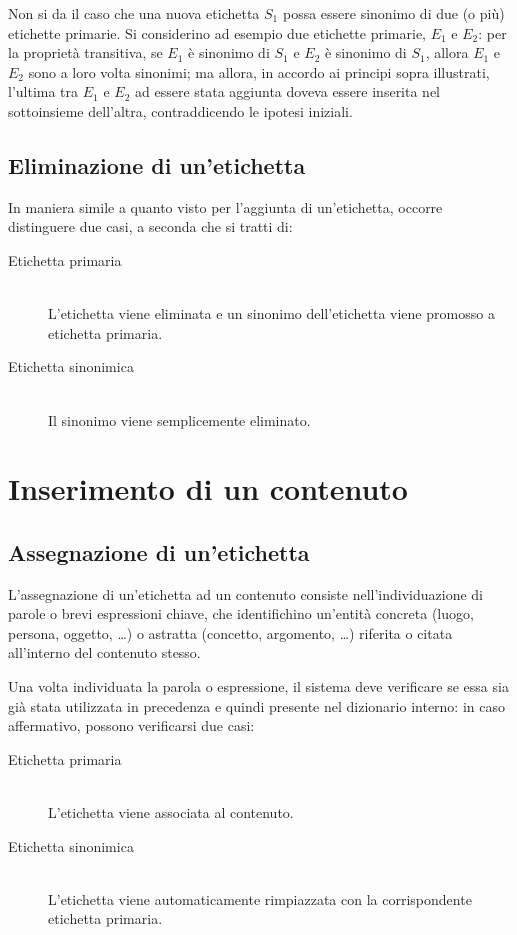 \documentclass[10pt,a4paper,headinclude,footinclude,hidelinks]{scrreprt} %
\begin{document}
	Non si da il caso che una nuova etichetta $S_1$ possa essere sinonimo di due (o più) etichette primarie. Si considerino ad esempio due etichette primarie, $E_1$ e $E_2$: per la proprietà transitiva, se $E_1$ è sinonimo di $S_1$ e $E_2$ è sinonimo di $S_1$, allora $E_1$ e $E_2$ sono a loro volta sinonimi; ma allora, in accordo ai principi sopra illustrati, l'ultima tra $E_1$ e $E_2$ ad essere stata aggiunta doveva essere inserita nel sottoinsieme dell'altra, contraddicendo le ipotesi iniziali.

	\subsection{Eliminazione di un'etichetta}
	In maniera simile a quanto visto per l'aggiunta di un'etichetta, occorre distinguere due casi, a seconda che si tratti di:
	\begin{description}
	\item[Etichetta primaria] \hfill \\
	L'etichetta viene eliminata e un sinonimo dell'etichetta viene promosso a etichetta primaria.
 	\item[Etichetta sinonimica] \hfill \\
	Il sinonimo viene semplicemente eliminato.
	\end{description}
	
	\section{Inserimento di un contenuto}
	\subsection{Assegnazione di un'etichetta}
	L'assegnazione di un'etichetta ad un contenuto consiste nell'individuazione di parole o brevi espressioni chiave, che identifichino un'entità concreta (luogo, persona, oggetto, \ldots) o astratta (concetto, argomento, \ldots) riferita o citata all'interno del contenuto stesso.
	
	Una volta individuata la parola o espressione, il sistema deve verificare se essa sia già stata utilizzata in precedenza e quindi presente nel dizionario interno: in caso affermativo, possono verificarsi due casi:
	\begin{description}
	\item[Etichetta primaria] \hfill \\
	L'etichetta viene associata al contenuto.
	\item[Etichetta sinonimica] \hfill \\
	L'etichetta viene automaticamente rimpiazzata con la corrispondente etichetta primaria.
	\end{description}
\end{document}
